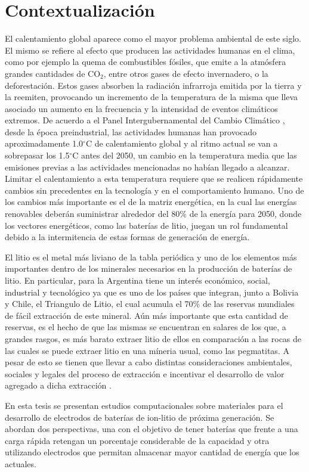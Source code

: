 \section{Contextualización}

El calentamiento global aparece como el mayor problema ambiental de este siglo.
El mismo se refiere al efecto que producen las actividades humanas en el clima, 
como por ejemplo la quema de combustibles fósiles, que emite 
a la atmósfera grandes cantidades de CO$_2$, entre otros gases de efecto 
invernadero, o la deforestación. Estos gases absorben la radiación infrarroja emitida por la tierra y la reemiten, 
provocando un incremento de la temperatura de la misma que lleva asociado un 
aumento en la frecuencia y la intensidad de eventos climáticos extremos. %
De acuerdo a el Panel Intergubernamental del Cambio Climático 
\cite{IPCC}, desde la época preindustrial, las actividades humanas han provocado 
aproximadamente 1.0$^{\circ}$C de calentamiento global y al ritmo actual se van 
a sobrepasar los 1.5$^{\circ}$C antes del 2050, un cambio en la temperatura
media que las emisiones previas a las actividades mencionadas no habían llegado a alcanzar. Limitar el 
calentamiento a esta temperatura requiere que se realicen rápidamente cambios 
sin precedentes en la tecnología y en el comportamiento humano. Uno de los 
cambios más importante es el de la matriz energética, en la cual las energías 
renovables deberán suministrar alrededor del 80\% de la energía para 2050, donde 
los vectores energéticos, como las baterías de litio, juegan un rol fundamental 
debido a la intermitencia de estas formas de generación de energía.

El litio es el metal más liviano de la tabla periódica y uno de los elementos más
importantes dentro de los minerales necesarios en la producción de baterías de
litio. En particular, para la Argentina tiene un interés económico, social, 
industrial y tecnológico ya que es uno de los países que integran, junto a 
Bolivia y Chile, el Triangulo de Litio, el cual acumula el 70\% de las reservas 
mundiales de fácil extracción de este mineral. Aún más importante que esta cantidad de reservas, es 
el hecho de que las mismas se encuentran en salares de los que, a grandes rasgos, es más barato
extraer litio de ellos en comparación a las rocas de las cuales se puede extraer 
litio en una míneria usual, como las pegmatitas. A pesar de esto se tienen que
llevar a cabo distintas consideraciones ambientales, sociales y legales del 
proceso de extracción e incentivar el desarrollo de valor agregado a dicha 
extracción \cite{gutierrez2022, petavratzi2022, obaya2021, romero2021, 
heredia2020, fornillo2019}.

En esta tesis se presentan estudios computacionales sobre materiales para el 
desarrollo de electrodos de baterías de ion-litio de próxima generación. Se 
abordan dos perspectivas, una con el objetivo de tener baterías que frente a una 
carga rápida retengan un porcentaje considerable de la capacidad y otra 
utilizando electrodos que permitan almacenar mayor cantidad de energía que los 
actuales.
